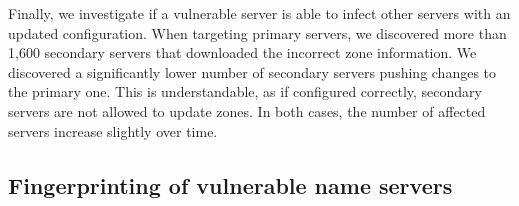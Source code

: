 Finally, we investigate if a vulnerable server is able to infect other servers with an updated configuration. When targeting primary servers, we discovered more than 1,600 secondary servers that downloaded the incorrect zone information. We discovered a significantly lower number of secondary servers pushing changes to the primary one. This is understandable, as if configured correctly, secondary servers are not allowed to update zones. In both cases, the number of affected servers increase slightly over time. 

\subsection{Fingerprinting of vulnerable name servers}
